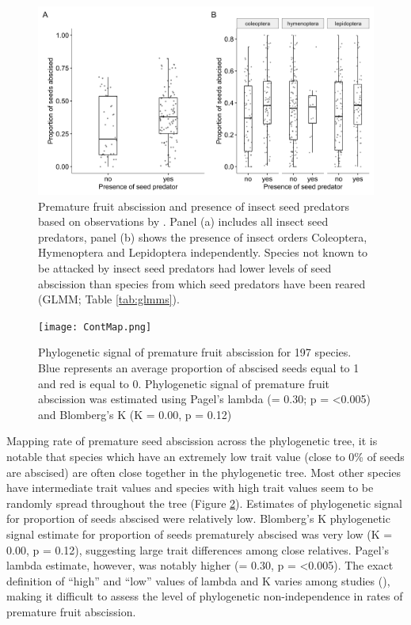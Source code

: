 \begin{figure}[!h]
\centering
\includegraphics[width=15cm]{predPres.png}
\caption{Premature fruit abscission and presence of insect seed predators based on observations by \cite{gripenbergHighlyResolvedFood2019}. Panel (a) includes all insect seed predators, panel (b) shows the presence of insect orders Coleoptera, Hymenoptera and Lepidoptera independently. Species not known to be attacked by insect seed predators had lower levels of seed abscission than species from which seed predators have been reared (GLMM; Table \ref{tab:glmms}).}
\label{fig:seedbox}
\end{figure}

\begin{figure}[!h]
\centering
\texttt{[image: ContMap.png]}
\caption{Phylogenetic signal of premature fruit abscission for 197 species. Blue represents an average proportion of abscised seeds equal to 1 and red is equal to 0. Phylogenetic signal of premature fruit abscission was estimated using Pagel’s lambda (\textlambda = 0.30; p = \textless0.005) and Blomberg's K (K = 0.00, p = 0.12)}
\label{fig:phylotree}
\end{figure}

Mapping rate of premature seed abscission across the phylogenetic tree, it is notable that species which have an extremely low trait value (close to 0\% of seeds are abscised) are often close together in the phylogenetic tree. Most other species have intermediate trait values and species with high trait values seem to be randomly spread throughout the tree (Figure \ref{fig:phylotree}). Estimates of phylogenetic signal for proportion of seeds abscised were relatively low.
Blomberg’s K phylogenetic signal estimate for proportion of seeds prematurely abscised was very low (K = 0.00, p = 0.12), suggesting large trait differences among close relatives. Pagel’s lambda estimate, however, was notably higher (\textlambda = 0.30, p = \textless 0.005). The exact definition of “high” and “low” values of lambda and K varies among studies (\cite{kamilarPhylogeneticSignalPrimate2013}), making it difficult to assess the level of phylogenetic non-independence in rates of premature fruit abscission.

